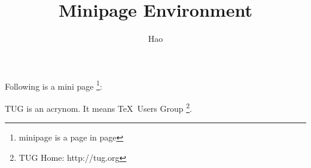 \documentclass[a4paper,10pt]{article}
\title{Minipage Environment}
\author{Hao}
\begin{document}
\maketitle
Following is a mini page \footnote{minipage is a page in page}:

\begin{minipage}{3cm}
 TUG is an acrynom. It means \TeX\ Users Group \footnote{TUG Home: http://tug.org}.
\end{minipage}
\end{document}
